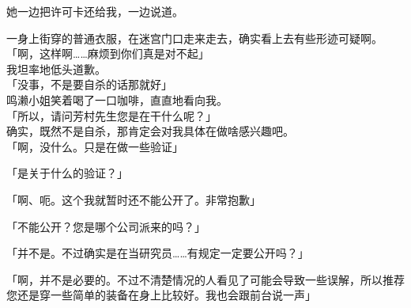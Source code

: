 她一边把许可卡还给我，一边说道。

一身上街穿的普通衣服，在迷宫门口走来走去，确实看上去有些形迹可疑啊。\\

「啊，这样啊……麻烦到你们真是对不起」\\

我坦率地低头道歉。\\

「没事，不是要自杀的话那就好」\\

鸣濑小姐笑着喝了一口咖啡，直直地看向我。\\

「所以，请问芳村先生您是在干什么呢？」\\

确实，既然不是自杀，那肯定会对我具体在做啥感兴趣吧。\\

「啊，没什么。只是在做一些验证」

「是关于什么的验证？」

「啊、呃。这个我就暂时还不能公开了。非常抱歉」

「不能公开？您是哪个公司派来的吗？」

「并不是。不过确实是在当研究员……有规定一定要公开吗？」

「啊，并不是必要的。不过不清楚情况的人看见了可能会导致一些误解，所以推荐您还是穿一些简单的装备在身上比较好。我也会跟前台说一声」

